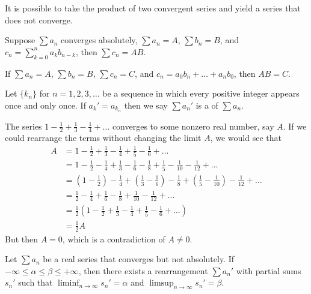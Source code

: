 \documentclass{mathnotes}
\begin{document}
\begin{note}
  It is possible to take the product of two convergent series and yield a
  series that does not converge.
\end{note}

\begin{prop}
  Suppose $\sum a_n$ converges absolutely, $\sum a_n=A$, $\sum b_n=B$,
  and $c_n=\sum_{k=0}^na_kb_{n-k}$, then $\sum c_n=AB$.
\end{prop}

\begin{prop}
  If $\sum a_n=A$, $\sum b_n=B$, $\sum c_n=C$, and $c_n=a_0b_n+\ldots+a_nb_0$,
  then $AB=C$.
\end{prop}

\begin{defi}
  Let $\{k_n\}$ for $n=1,2,3,\ldots$ be a sequence in which every positive
  integer appears once and only once. If $a_k'=a_{k_n}$ then we say $\sum a_n'$
  is a  of $\sum a_n$.
\end{defi}

\begin{ex}
  The series $1-\frac{1}{2}+\frac{1}{3}-\frac{1}{4}+\ldots$ converges to some
  nonzero real number, say $A$. If we could rearrange the terms without
  changing the limit $A$, we would see that
  \begin{align*}
    A&=1-\frac{1}{2}+\frac{1}{3}-\frac{1}{4}+\frac{1}{5}-\frac{1}{6}+\ldots\\
     &=1-\frac{1}{2}-\frac{1}{4}+\frac{1}{3}-\frac{1}{6}-\frac{1}{8}
     +\frac{1}{5}-\frac{1}{10}-\frac{1}{12}+\ldots\\
     &=\left(1-\frac{1}{2}\right)-\frac{1}{4}+\left(\frac{1}{3}
     -\frac{1}{6}\right)-\frac{1}{8}+\left(\frac{1}{5}
     -\frac{1}{10}\right)-\frac{1}{12}+\ldots\\
     &=\frac{1}{2}-\frac{1}{4}+\frac{1}{6}-\frac{1}{8}+\frac{1}{10}
     -\frac{1}{12}+\ldots\\
     &=\frac{1}{2}\left(1-\frac{1}{2}+\frac{1}{3}-\frac{1}{4}+\frac{1}{5}
     -\frac{1}{6}+\ldots\right)\\
     &=\frac{1}{2}A
  \end{align*}
  But then $A=0$, which is a contradiction of $A\neq0$.
\end{ex}

\begin{prop}
  Let $\sum a_n$ be a real series that converges but not absolutely. If
  $-\infty\le\alpha\le\beta\le+\infty$, then there exists a rearrangement $\sum
  a_n'$ with partial sums $s_n'$ such that $\liminf_{n\to\infty}s_n'=\alpha$
  and $\limsup_{n\to\infty}s_n'=\beta$.
\end{prop}
\end{document}
